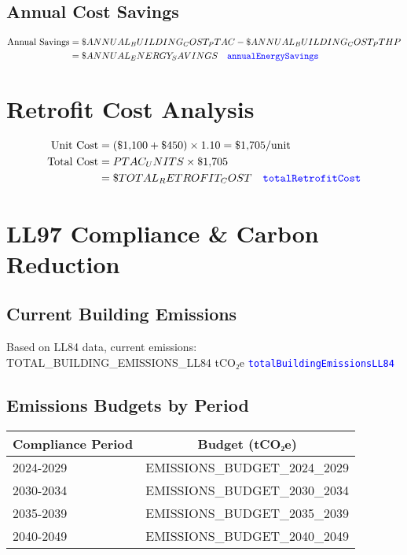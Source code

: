 \documentclass[11pt,letterpaper]{article}
\newcommand{\code}[1]{\textcolor{blue}{\texttt{#1}}}
\begin{document}
\subsection{Annual Cost Savings}
\begin{align}
\text{Annual Savings} &= \${{ANNUAL_BUILDING_COST_PTAC}} - \${{ANNUAL_BUILDING_COST_PTHP}} \\
&= \${{ANNUAL_ENERGY_SAVINGS}} \quad \code{annualEnergySavings}
\end{align}

\section{Retrofit Cost Analysis}

\begin{align}
\text{Unit Cost} &= (\$1{,}100 + \$450) \times 1.10 = \$1{,}705/\text{unit} \\
\text{Total Cost} &= {{PTAC_UNITS}} \times \$1{,}705 \\
&= \${{TOTAL_RETROFIT_COST}} \quad \code{totalRetrofitCost}
\end{align}

\section{LL97 Compliance \& Carbon Reduction}

\subsection{Current Building Emissions}
Based on LL84 data, current emissions: {{TOTAL_BUILDING_EMISSIONS_LL84}} tCO₂e \quad \code{totalBuildingEmissionsLL84}

\subsection{Emissions Budgets by Period}
\begin{tabular}{lc}
\hline
Compliance Period & Budget (tCO₂e) \\
\hline
2024-2029 & {{EMISSIONS_BUDGET_2024_2029}} \\
2030-2034 & {{EMISSIONS_BUDGET_2030_2034}} \\
2035-2039 & {{EMISSIONS_BUDGET_2035_2039}} \\
2040-2049 & {{EMISSIONS_BUDGET_2040_2049}} \\
\hline
\end{tabular}
\end{document}
